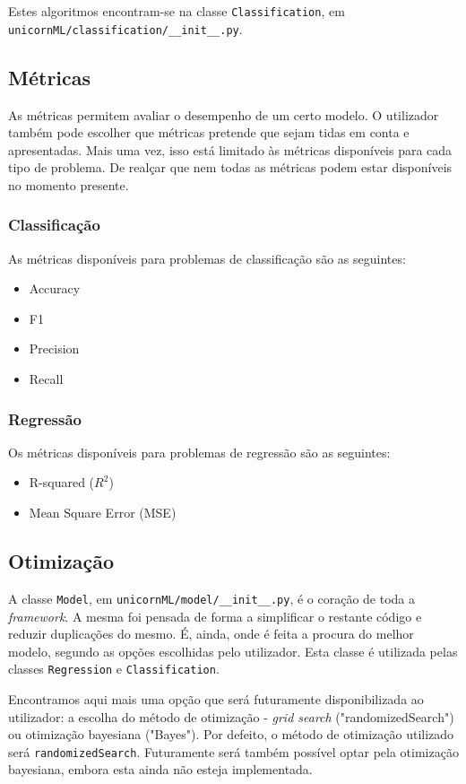 \documentclass[a4paper]{report}
\begin{document}
{			Estes algoritmos encontram-se na classe \texttt{Classification}, em \texttt{unicornML/classification/\_\_init\_\_.py}.

		\subsection{Métricas} \label{subsec:A-3}
		As métricas permitem avaliar o desempenho de um certo modelo. 
		O utilizador também pode escolher que métricas pretende que sejam tidas em conta e apresentadas.
		Mais uma vez, isso está limitado às métricas disponíveis para cada tipo de problema.
		De realçar que nem todas as métricas podem estar disponíveis no momento presente.

            \subsubsection{Classificação} \label{sssec:A-3-1}
			As métricas disponíveis para problemas de classificação são as seguintes:
			\begin{itemize}
				\item Accuracy
				\item F1
				\item Precision
				\item Recall
			\end{itemize}

            \subsubsection{Regressão} \label{sssec:A-3-2}
			Os métricas disponíveis para problemas de regressão são as seguintes:
			\begin{itemize}
				\item R-squared ($R^{2}$) 
				\item Mean Square Error (MSE)
			\end{itemize}


		\subsection{Otimização} \label{subsec:A-4}
		A classe \texttt{Model}, em \texttt{unicornML/model/\_\_init\_\_.py}, é o coração de toda a \textit{framework}.
		A mesma foi pensada de forma a simplificar o restante código e reduzir duplicações do mesmo. 
		É, ainda, onde é feita a procura do melhor modelo, segundo as opções escolhidas pelo utilizador.
		Esta classe é utilizada pelas classes \texttt{Regression} e \texttt{Classification}.
		
		Encontramos aqui mais uma opção que será futuramente disponibilizada ao utilizador: a escolha do método de otimização - \textit{grid search} ("randomizedSearch") ou otimização bayesiana ("Bayes").
		Por defeito, o método de otimização utilizado será \texttt{randomizedSearch}. Futuramente será também possível optar pela otimização bayesiana, embora esta ainda não esteja implementada.

}
\end{document}
